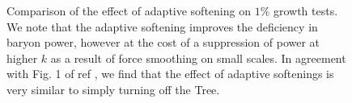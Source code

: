 \documentclass[]{article}
\begin{document}
\begin{figure}[h]
	\caption{Comparison of the effect of adaptive softening on $1\%$ growth tests. We note that the adaptive softening improves the deficiency in baryon power, however at the cost of a suppression of power at higher $k$ as a result of force smoothing on small scales. In agreement with Fig. 1 of ref \cite{Angulo2013}, we find that the effect of adaptive softenings is very similar to simply turning off the Tree.}
\end{figure}
\clearpage
\end{document}
